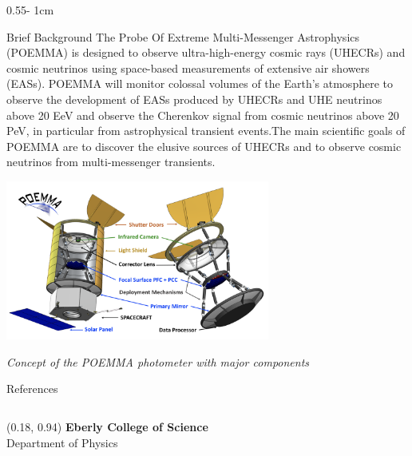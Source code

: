 \documentclass{../psuposter}
\begin{document}
\begin{frame}
\begin{columns}[t, totalwidth=\textwidth]
\begin{column}{0.55\textwidth - 1cm}
    \begin{block}{Brief Background}
    	The Probe Of Extreme Multi-Messenger Astrophysics (POEMMA) is designed to observe ultra-high-energy cosmic rays (UHECRs) and cosmic neutrinos using space-based measurements of extensive air showers (EASs). POEMMA will monitor colossal volumes of the Earth’s atmosphere to observe the development of EASs produced by UHECRs and UHE neutrinos above 20 EeV and observe the Cherenkov signal from cosmic neutrinos above 20 PeV, in particular from astrophysical transient events.The main scientific goals of POEMMA are to discover the elusive sources of UHECRs and to observe cosmic neutrinos from multi-messenger transients. \cite{olintoPOEMMAProbeExtreme2020}
        \begin{center}
		   	\includegraphics[width=0.65\textwidth]{images/background}    
		   	
		   		
		   	\textit{Concept of the POEMMA photometer with major components \cite{olintoPOEMMAProbeExtreme2020}}
    	\end{center}
    \end{block}


    \begin{block}{References}
    	\nocite{*}
        
		
    \end{block}

\end{column}
\end{columns}


\begin{textblock}{0.5}(0.18, 0.94)
    \color{white}
    \sffamily
    \textbf{Eberly College of Science}
    \\
    Department of Physics
\end{textblock}


\end{frame}
\end{document}
